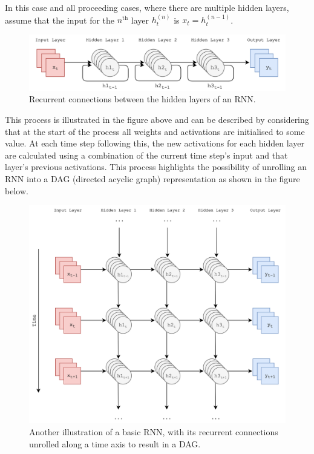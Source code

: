 \documentclass[12pt,]{article}
\begin{document}
In this case and all proceeding cases, where there are multiple hidden
layers, assume that the input for the \(n^{\text{th}}\) layer
\(h^{(n)}_t\) is \(x_t = h^{(n-1)}_t\).

\begin{figure}
\centering
\includegraphics{Images/rnn.png}
\caption{Recurrent connections between the hidden layers of an RNN.}
\end{figure}

This process is illustrated in the figure above and can be described by
considering that at the start of the process all weights and activations
are initialised to some value. At each time step following this, the new
activations for each hidden layer are calculated using a combination of
the current time step's input and that layer's previous activations.
This process highlights the possibility of unrolling an RNN into a DAG
(directed acyclic graph) representation as shown in the figure below.

\begin{figure}
\centering
\includegraphics{Images/unrolledrnn.png}
\caption{Another illustration of a basic RNN, with its recurrent
connections unrolled along a time axis to result in a DAG.}
\end{figure}
\end{document}
